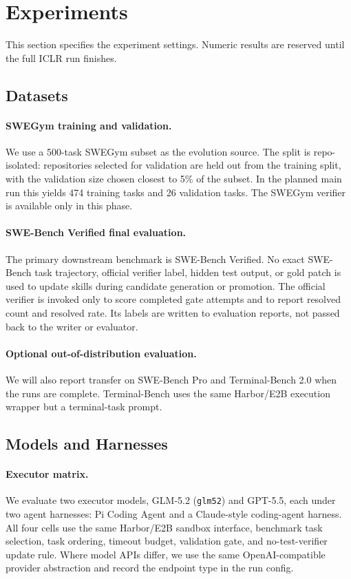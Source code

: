 \documentclass{article}
\begin{document}
\section{Experiments}

This section specifies the experiment settings. Numeric results are reserved
until the full ICLR run finishes.

\subsection{Datasets}

\paragraph{SWEGym training and validation.}
We use a 500-task SWEGym subset as the evolution source. The split is
repo-isolated: repositories selected for validation are held out from the
training split, with the validation size chosen closest to 5\% of the subset.
In the planned main run this yields 474 training tasks and 26 validation tasks.
The SWEGym verifier is available only in this phase.

\paragraph{SWE-Bench Verified final evaluation.}
The primary downstream benchmark is SWE-Bench Verified. No exact SWE-Bench task
trajectory, official verifier label, hidden test output, or gold patch is used
to update skills during candidate generation or promotion. The official verifier
is invoked only to score completed gate attempts and to report resolved count
and resolved rate. Its labels are written to evaluation reports, not passed back
to the writer or evaluator.

\paragraph{Optional out-of-distribution evaluation.}
We will also report transfer on SWE-Bench Pro and Terminal-Bench 2.0 when the
runs are complete. Terminal-Bench uses the same Harbor/E2B execution wrapper
but a terminal-task prompt.

\subsection{Models and Harnesses}

\paragraph{Executor matrix.}
We evaluate two executor models, GLM-5.2 (\texttt{glm52}) and GPT-5.5, each
under two agent harnesses: Pi Coding Agent and a Claude-style coding-agent
harness. All four cells use the same Harbor/E2B sandbox interface, benchmark
task selection, task ordering, timeout budget, validation gate, and
no-test-verifier update rule. Where model APIs differ, we use the same
OpenAI-compatible provider abstraction and record the endpoint type in the run
config.
\end{document}
